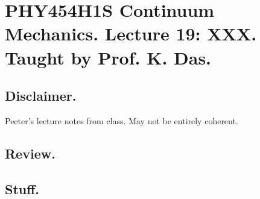 
%

\chapter{PHY454H1S Continuum Mechanics.  Lecture 19: XXX.  Taught by Prof. K. Das.}
\label{chap:continuumL19}
{}
\date{Mar 23, 2012}

\beginArtWithToc

\section{Disclaimer.}

Peeter's lecture notes from class.  May not be entirely coherent.

\section{Review.}

\section{Stuff.}


\EndNoBibArticle
